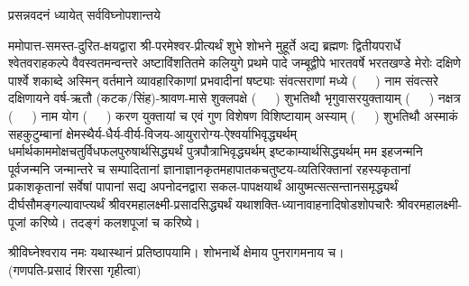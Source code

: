 
\setlength{\parindent}{0pt}


 

{प्रसन्नवदनं ध्यायेत् सर्वविघ्नोपशान्तये}
 

ममोपात्त-समस्त-दुरित-क्षयद्वारा श्री-परमेश्वर-प्रीत्यर्थं शुभे शोभने मुहूर्ते अद्य ब्रह्मणः
द्वितीयपरार्धे श्वेतवराहकल्पे वैवस्वतमन्वन्तरे अष्टाविंशतितमे कलियुगे प्रथमे पादे
जम्बूद्वीपे भारतवर्षे भरतखण्डे मेरोः दक्षिणे पार्श्वे शकाब्दे अस्मिन् वर्तमाने व्यावहारिकाणां प्रभवादीनां षष्ट्याः संवत्सराणां मध्ये \mbox{(~~~)} नाम संवत्सरे दक्षिणायने 
वर्ष-ऋतौ (कटक/सिंह)-श्रावण-मासे शुक्लपक्षे \mbox{(~~~)} शुभतिथौ भृगुवासरयुक्तायाम्
\mbox{(~~~)} नक्षत्र \mbox{(~~~)} नाम  योग  \mbox{(~~~)} करण युक्तायां च एवं गुण विशेषण विशिष्टायाम्
अस्याम् \mbox{(~~~)} शुभतिथौ 
अस्माकं सहकुटुम्बानां क्षेमस्थैर्य-धैर्य-वीर्य-विजय-आयुरारोग्य-ऐश्वर्याभिवृद्ध्यर्थम्
 धर्मार्थकाममोक्ष\-चतुर्विधफलपुरुषार्थसिद्ध्यर्थं पुत्रपौत्राभि\-वृद्ध्यर्थम् इष्टकाम्यार्थसिद्ध्यर्थम्
मम इहजन्मनि पूर्वजन्मनि जन्मान्तरे च सम्पादितानां ज्ञानाज्ञानकृतमहा\-पातकचतुष्टय-व्यतिरिक्तानां रहस्यकृतानां प्रकाशकृतानां सर्वेषां पापानां सद्य अपनोदनद्वारा सकल-पापक्षयार्थं आयुष्मत्सत्सन्तानसमृद्ध्यर्थं दीर्घसौमङ्गल्यावाप्त्यर्थं
श्रीवरमहालक्ष्मी-प्रसादसिद्ध्यर्थं 
यथाशक्ति-ध्यानावाहनादिषोडशोपचारैः 
श्रीवरमहालक्ष्मी-पूजां करिष्ये। तदङ्गं कलशपूजां च करिष्ये। 


श्रीविघ्नेश्वराय नमः यथास्थानं प्रतिष्ठापयामि। शोभनार्थे क्षेमाय पुनरागमनाय च।\\
(गणपति-प्रसादं शिरसा गृहीत्वा)





\begingroup
\renewcommand{\devaName}{देवि}

\endgroup







